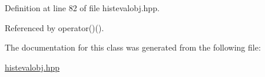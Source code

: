 \-Definition at line 82 of file histevalobj.\-hpp.



\-Referenced by operator()().



\-The documentation for this class was generated from the following file\-:\begin{DoxyCompactItemize}
\item 
\hyperlink{histevalobj_8hpp}{histevalobj.\-hpp}\end{DoxyCompactItemize}
